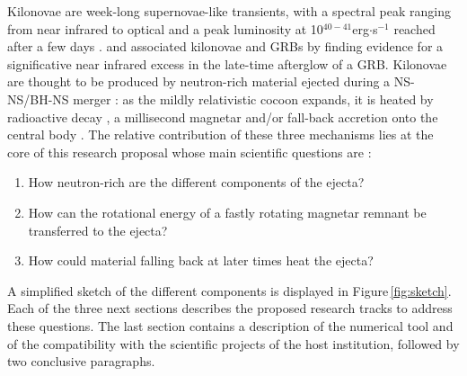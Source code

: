 \documentclass[12pt,onecolumn]{article}
\makeatletter
\newcommand{\grb}{GRB\xspace}
\newcommand{\grbs}{GRBs\xspace}
\newcommand*{\ns}{NS\@\xspace}
\newcommand*{\bh}{BH\@\xspace}
\makeatother
\begin{document}
Kilonovae are week-long supernovae-like transients, with a spectral peak ranging from near infrared to optical and a peak luminosity at 10$^{40-41}$erg$\cdot$s$^{-1}$ reached after a few days \citep{Tanaka2016,Metzger2017}. \citet{Tanvir2013} and \citet{Berger2013} associated kilonovae and \grbs by finding evidence for a significative near infrared excess in the late-time afterglow of a \grb. Kilonovae are thought to be produced by neutron-rich material ejected during a \ns-\ns/\bh-\ns merger : as the mildly relativistic cocoon expands, it is heated by radioactive decay \citep{Li1998}, a millisecond magnetar \citep{Yu2013} and/or fall-back accretion onto the central body \citep{Rosswog2007}. The relative contribution of these three mechanisms lies at the core of this research proposal whose main scientific questions are :

\begin{enumerate}[itemsep=0mm]
\item How neutron-rich are the different components of the ejecta?
\item How can the rotational energy of a fastly rotating magnetar remnant be transferred to the ejecta?
\item How could material falling back at later times heat the ejecta?
\end{enumerate}

A simplified sketch of the different components is displayed in Figure\,\ref{fig:sketch}. Each of the three next sections describes the proposed research tracks to address these questions. The last section contains a description of the numerical tool and of the compatibility with the scientific projects of the host institution, followed by two conclusive paragraphs.
\end{document}
